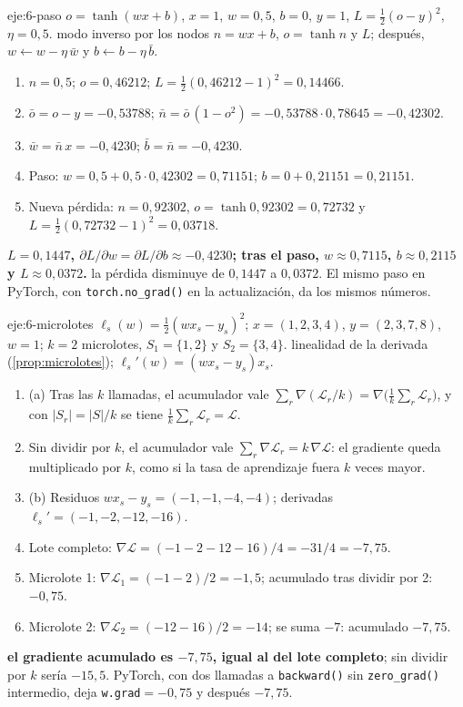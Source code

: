 \begin{solucion}{eje:6-paso}
\datos $o=\tanh(wx+b)$, $x=1$, $w=0{,}5$, $b=0$, $y=1$, $L=\tfrac12(o-y)^{2}$, $\eta=0{,}5$.
\planteamiento modo inverso por los nodos $n=wx+b$, $o=\tanh n$ y $L$; después, $w\gets w-\eta\,\bar w$ y $b\gets b-\eta\,\bar b$.
\pasos
\begin{enumerate}[label=\arabic*.]
  \item $n=0{,}5$; $o=0{,}46212$; $L=\tfrac12(0{,}46212-1)^{2}=0{,}14466$.
  \item $\bar o=o-y=-0{,}53788$; $\bar n=\bar o\,(1-o^{2})=-0{,}53788\cdot 0{,}78645=-0{,}42302$.
  \item $\bar w=\bar n\,x=-0{,}4230$; $\bar b=\bar n=-0{,}4230$.
  \item Paso: $w=0{,}5+0{,}5\cdot 0{,}42302=0{,}71151$; $b=0+0{,}21151=0{,}21151$.
  \item Nueva pérdida: $n=0{,}92302$, $o=\tanh 0{,}92302=0{,}72732$ y $L=\tfrac12(0{,}72732-1)^{2}=0{,}03718$.
\end{enumerate}
\resultado \textbf{$L=0{,}1447$, $\partial L/\partial w=\partial L/\partial b\approx-0{,}4230$; tras el paso, $w\approx 0{,}7115$, $b\approx 0{,}2115$ y $L\approx 0{,}0372$.}
\comprobacion la pérdida disminuye de $0{,}1447$ a $0{,}0372$. El mismo paso en PyTorch, con \texttt{torch.no\_grad()} en la actualización, da los mismos números.
\end{solucion}

\begin{solucion}{eje:6-microlotes}
\datos $\ell_s(w)=\tfrac12(wx_s-y_s)^{2}$; $x=(1,2,3,4)$, $y=(2,3,7,8)$, $w=1$; $k=2$ microlotes, $S_1=\{1,2\}$ y $S_2=\{3,4\}$.
\planteamiento linealidad de la derivada (\cref{prop:microlotes}); $\ell_s'(w)=(wx_s-y_s)x_s$.
\pasos
\begin{enumerate}[label=\arabic*.]
  \item (a) Tras las $k$ llamadas, el acumulador vale $\sum_r\nabla(\mathcal L_r/k)=\nabla\bigl(\frac1k\sum_r\mathcal L_r\bigr)$, y con $|S_r|=|S|/k$ se tiene $\frac1k\sum_r\mathcal L_r=\mathcal L$.
  \item Sin dividir por $k$, el acumulador vale $\sum_r\nabla\mathcal L_r=k\,\nabla\mathcal L$: el gradiente queda multiplicado por $k$, como si la tasa de aprendizaje fuera $k$ veces mayor.
  \item (b) Residuos $wx_s-y_s=(-1,-1,-4,-4)$; derivadas $\ell_s'=(-1,-2,-12,-16)$.
  \item Lote completo: $\nabla\mathcal L=(-1-2-12-16)/4=-31/4=-7{,}75$.
  \item Microlote 1: $\nabla\mathcal L_1=(-1-2)/2=-1{,}5$; acumulado tras dividir por 2: $-0{,}75$.
  \item Microlote 2: $\nabla\mathcal L_2=(-12-16)/2=-14$; se suma $-7$: acumulado $-7{,}75$.
\end{enumerate}
\resultado \textbf{el gradiente acumulado es $-7{,}75$, igual al del lote completo}; sin dividir por $k$ sería $-15{,}5$.
\comprobacion PyTorch, con dos llamadas a \texttt{backward()} sin \texttt{zero\_grad()} intermedio, deja \texttt{w.grad}${}=-0{,}75$ y después $-7{,}75$.
\end{solucion}
